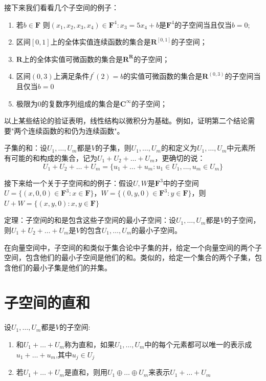 \documentclass[10pt,a4paper,UTF8]{article}
\begin{document}
接下来我们看看几个子空间的例子：
\begin{instance}
\begin{enumerate}
\item 若\(b\in\mathbf{F}\) 则\({(x_{1},x_{2},x_{3},x_{4})\in \mathbf{F}^{4}:x_{3}=5x_{4}+b}\)是\(\mathbf{F}^{4}\)的子空间当且仅当\(b=0\);
\item 区间\([0,1]\)上的全体实值连续函数的集合是\(\mathbf{R}^{[0,1]}\)的子空间；
\item \(\mathbf{R}\)上的全体实值可微函数的集合是\(\mathbf{R}^{\mathbf{R}}\)的子空间；
\item 区间\((0,3)\)上满足条件\(f^{'}(2)=b\)的实值可微函数的集合是\(\mathbf{R}^{(0,3)}\)的子空间当且仅当\(b=0\)
\item 极限为\(0\)的复数序列组成的集合是\(\mathbf{C}^{\infty}\)的子空间；
\end{enumerate}
\end{instance}
以上某些结论的验证表明，线性结构以微积分为基础。例如，证明第二个结论需要"两个连续函数的和仍为连续函数"。

\begin{definition}
子集的和：设\(U_{1},\ldots,U_{m}\)都是\(V\)的子集，则\(U_{1},\ldots,U_{m}\)的和定义为\(U_{1},\ldots,U_{m}\)中元素所有可能的和构成的集合，记为\(U_{1}+U_{2}+\ldots + U_{m}\)，更确切的说：\[U_{1}+U_{2}+\ldots + U_{m} = \{u_{1} + \ldots + u_{m}:u_{1}\in U_{1},\ldots,u_{m}\in U_{m} \}\]
\end{definition}

\begin{instance}
接下来给一个关于子空间和的例子：假设\(U,W\)是\(\mathbf{F}^{3}\)中的子空间\(U=\{(x,0,0)\in \mathbf{F}^{3}:x\in \mathbf{F}\}\)，\(W=\{(0,y,0)\in \mathbf{F}^{3}:y\in \mathbf{F}\}\)，则\(U+W = \{(x,y,0):x,y\in \mathbf{F}\}\)
\end{instance}
\begin{theorem}
定理：子空间的和是包含这些子空间的最小子空间：设\(U_{1},\ldots,U_{m}\)都是\(V\)的子空间，则\(U_{1}+U_{2}+\ldots + U_{m}\)是\(V\)的包含\(U_{1},\ldots,U_{m}\)的最小子空间。
\end{theorem}
在向量空间中，子空间的和类似于集合论中子集的并，给定一个向量空间的两个子空间，包含他们的最小子空间是他们的和。类似的，给定一个集合的两个子集，包含他们的最小子集是他们的并集。
\section{子空间的直和}
\label{sec:orgheadline4}


\begin{definition}
设\(U_{1},\ldots,U_{m}\)都是\(V\)的子空间:
\begin{enumerate}
\item 和\(U_{1} + \ldots + U_{m}\)称为直和，如果\(U_{1},\ldots,U_{m}\)中的每个元素都可以唯一的表示成\(u_{1}+\ldots +u_{m}\),其中\(u_{j} \in U_{j}\)
\item 若\(U_{1} + \ldots + U_{m}\)是直和，则用\(U_{1} \oplus \ldots \oplus U_{m}\)来表示\(U_{1}+\ldots + U_{m}\)
\end{enumerate}
\end{definition}
\end{document}
